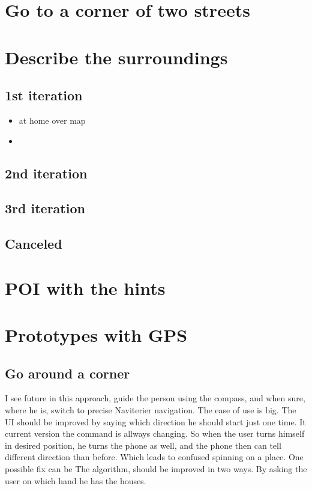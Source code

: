\documentclass[11pt,oneside,a4paper]{book}
\begin{document}
			\section{Go to a corner of two streets}		
			\section{Describe the surroundings}
			\subsection{1st iteration}
			\begin{itemize}
				\item at home over map
				\item 
			\end{itemize}
			\subsection{2nd iteration}			
			\subsection{3rd iteration}	
			\subsection{Canceled}		
			\section{POI with the hints}
			
			
		\section{Prototypes with GPS}
			\subsection{Go around a corner}
			I see future in this approach, guide the person using the compass, and when sure, where he is, switch to precise Naviterier navigation.
			The ease of use is big.
			The UI should be improved by saying which direction he should start just one time. It current version the command is allways changing. So when the user turns himself in desired position, he turns the phone as well, and the phone then can tell different direction than before. Which leads to confused spinning on a place. One possible fix can be 
			The algorithm, should be improved in two ways. By asking the user on which hand he has the houses.
\end{document}
